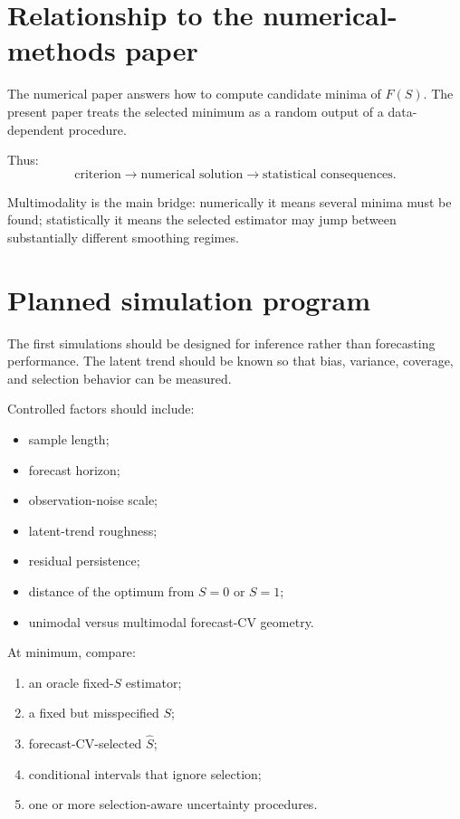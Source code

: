 \documentclass[11pt]{article}
\begin{document}
\section{Relationship to the numerical-methods paper}

The numerical paper answers how to compute candidate minima of \(F(S)\). The
present paper treats the selected minimum as a random output of a data-dependent
procedure.

Thus:
\[
\text{criterion}
\longrightarrow
\text{numerical solution}
\longrightarrow
\text{statistical consequences}.
\]

Multimodality is the main bridge: numerically it means several minima must be
found; statistically it means the selected estimator may jump between
substantially different smoothing regimes.

\section{Planned simulation program}

The first simulations should be designed for inference rather than forecasting
performance. The latent trend should be known so that bias, variance, coverage,
and selection behavior can be measured.

Controlled factors should include:
\begin{itemize}
\item sample length;
\item forecast horizon;
\item observation-noise scale;
\item latent-trend roughness;
\item residual persistence;
\item distance of the optimum from \(S=0\) or \(S=1\);
\item unimodal versus multimodal forecast-CV geometry.
\end{itemize}

At minimum, compare:
\begin{enumerate}
\item an oracle fixed-\(S\) estimator;
\item a fixed but misspecified \(S\);
\item forecast-CV-selected \(\widehat S\);
\item conditional intervals that ignore selection;
\item one or more selection-aware uncertainty procedures.
\end{enumerate}
\end{document}
